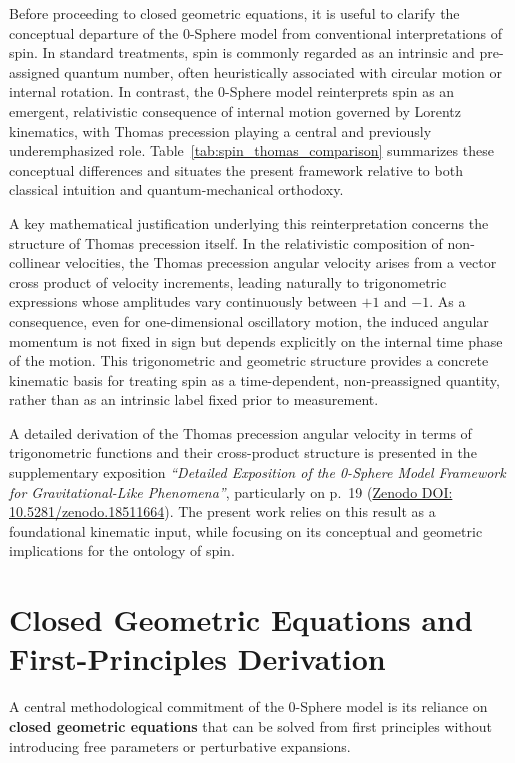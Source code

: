 \documentclass[12pt,letterpaper]{article}
\begin{document}
Before proceeding to closed geometric equations, it is useful to clarify the conceptual departure of the 0-Sphere model from conventional interpretations of spin. 
In standard treatments, spin is commonly regarded as an intrinsic and pre-assigned quantum number, often heuristically associated with circular motion or internal rotation. 
In contrast, the 0-Sphere model reinterprets spin as an emergent, relativistic consequence of internal motion governed by Lorentz kinematics, with Thomas precession playing a central and previously underemphasized role. 
Table~\ref{tab:spin_thomas_comparison} summarizes these conceptual differences and situates the present framework relative to both classical intuition and quantum-mechanical orthodoxy.

A key mathematical justification underlying this reinterpretation concerns the structure of Thomas precession itself. 
In the relativistic composition of non-collinear velocities, the Thomas precession angular velocity arises from a vector cross product of velocity increments, leading naturally to trigonometric expressions whose amplitudes vary continuously between $+1$ and $-1$. 
As a consequence, even for one-dimensional oscillatory motion, the induced angular momentum is not fixed in sign but depends explicitly on the internal time phase of the motion. 
This trigonometric and geometric structure provides a concrete kinematic basis for treating spin as a time-dependent, non-preassigned quantity, rather than as an intrinsic label fixed prior to measurement.

A detailed derivation of the Thomas precession angular velocity in terms of trigonometric functions and their cross-product structure is presented in the supplementary exposition
\emph{``Detailed Exposition of the 0-Sphere Model Framework for Gravitational-Like Phenomena''}, particularly on p.~19
(\href{https://doi.org/10.5281/zenodo.18511664}{Zenodo DOI: 10.5281/zenodo.18511664}). 
The present work relies on this result as a foundational kinematic input, while focusing on its conceptual and geometric implications for the ontology of spin.


\section{Closed Geometric Equations and First-Principles Derivation}

A central methodological commitment of the 0-Sphere model is its reliance on \textbf{closed geometric equations} that can be solved from first principles without introducing free parameters or perturbative expansions.
\end{document}
